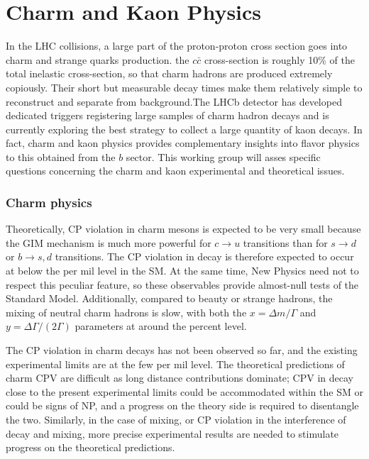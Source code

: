 \section{Charm and Kaon Physics}
\label{sec:CharmAndKaon}
In the LHC collisions, a large part of the proton-proton cross section goes into charm and strange quarks production.  
the $c \bar{c}$ cross-section is roughly 10\% of the total inelastic cross-section, so that charm hadrons are produced extremely copiously. Their short but measurable decay times make them relatively simple to reconstruct and separate from background.The LHCb detector has developed dedicated triggers registering  large samples of charm hadron decays and is currently exploring the best strategy to collect a large quantity of kaon decays. In fact, charm and kaon physics provides complementary insights into flavor physics to this obtained from the $b$ sector.  
This working group will asses specific questions concerning the charm and kaon experimental and theoretical issues. 

\subsubsection*{Charm physics}
 Theoretically, CP violation in charm mesons is expected to be very small
because the GIM mechanism is much more powerful for $c\rightarrow u$
transitions than for $s\rightarrow d$ or $b\rightarrow s,d$ transitions. The CP violation in decay is therefore expected to occur at below the per mil level in the SM.  
At the same time, New Physics need not to respect this peculiar feature, so these
observables provide almost-null tests of the Standard Model.  
Additionally, compared to beauty or strange hadrons, the mixing of neutral charm hadrons is slow, with both the $x = \Delta m/\Gamma$ and $y = \Delta \Gamma/ (2\Gamma)$ parameters at around the percent level.

 The CP violation in charm decays has not been observed so far, and the existing experimental limits are at the few per mil level. The theoretical predictions of charm CPV are difficult as long distance contributions dominate; CPV in decay close to the present experimental limits could be accommodated within the SM or could be signs of NP, and a progress on the theory side is required to disentangle the two. Similarly, in the case of mixing, or CP violation in the interference of decay and mixing, more precise experimental results are needed to stimulate progress on the theoretical predictions.

